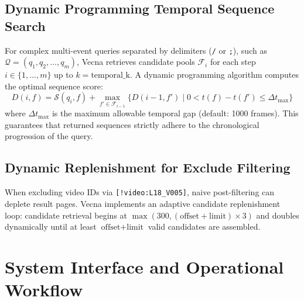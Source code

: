 \documentclass[10pt,a4paper,twocolumn]{article}
\begin{document}
\subsection{Dynamic Programming Temporal Sequence Search}
For complex multi-event queries separated by delimiters (\texttt{/} or \texttt{;}), such as $\mathcal{Q} = (q_1, q_2, \dots, q_m)$, Vecna retrieves candidate pools $\mathcal{F}_i$ for each step $i \in \{1, \dots, m\}$ up to $k = \text{temporal\_k}$. A dynamic programming algorithm computes the optimal sequence score:
\begin{equation}
D(i, f) = \mathcal{S}(q_i, f) + \max_{f' \in \mathcal{F}_{i-1}} \Big\{ D(i-1, f') \;\Big|\; 0 < t(f) - t(f') \le \Delta t_{\text{max}} \Big\}
\end{equation}
where $\Delta t_{\text{max}}$ is the maximum allowable temporal gap (default: 1000 frames). This guarantees that returned sequences strictly adhere to the chronological progression of the query.

\subsection{Dynamic Replenishment for Exclude Filtering}
When excluding video IDs via \texttt{[!video:L18\_V005]}, naive post-filtering can deplete result pages. Vecna implements an adaptive candidate replenishment loop: candidate retrieval begins at $\max(300, (\text{offset} + \text{limit}) \times 3)$ and doubles dynamically until at least $\text{offset} + \text{limit}$ valid candidates are assembled.

\section{System Interface and Operational Workflow}
\end{document}
